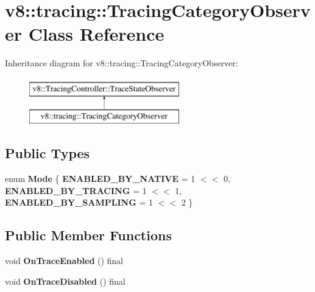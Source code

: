 \hypertarget{classv8_1_1tracing_1_1TracingCategoryObserver}{}\section{v8\+:\+:tracing\+:\+:Tracing\+Category\+Observer Class Reference}
\label{classv8_1_1tracing_1_1TracingCategoryObserver}
Inheritance diagram for v8\+:\+:tracing\+:\+:Tracing\+Category\+Observer\+:\begin{figure}[H]
\begin{center}
\leavevmode
\includegraphics[height=2.000000cm]{classv8_1_1tracing_1_1TracingCategoryObserver}
\end{center}
\end{figure}
\subsection*{Public Types}
\begin{DoxyCompactItemize}
\item 
\mbox{\label{classv8_1_1tracing_1_1TracingCategoryObserver_aeb955195fe66a5b0497cff536c090589}} 
enum {\bfseries Mode} \{ {\bfseries E\+N\+A\+B\+L\+E\+D\+\_\+\+B\+Y\+\_\+\+N\+A\+T\+I\+VE} = 1 $<$$<$ 0, 
{\bfseries E\+N\+A\+B\+L\+E\+D\+\_\+\+B\+Y\+\_\+\+T\+R\+A\+C\+I\+NG} = 1 $<$$<$ 1, 
{\bfseries E\+N\+A\+B\+L\+E\+D\+\_\+\+B\+Y\+\_\+\+S\+A\+M\+P\+L\+I\+NG} = 1 $<$$<$ 2
 \}
\end{DoxyCompactItemize}
\subsection*{Public Member Functions}
\begin{DoxyCompactItemize}
\item 
\mbox{\label{classv8_1_1tracing_1_1TracingCategoryObserver_a5998fa655c47d1f6c3eb24bbf3c81be7}} 
void {\bfseries On\+Trace\+Enabled} () final
\item 
\mbox{\label{classv8_1_1tracing_1_1TracingCategoryObserver_ad79267072888fc1e0324342e084fc533}} 
void {\bfseries On\+Trace\+Disabled} () final
\end{DoxyCompactItemize}
